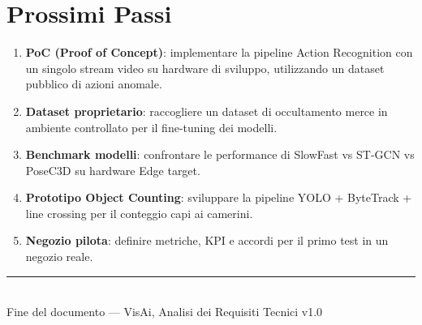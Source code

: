 \documentclass[a4paper, 12pt]{article}
\begin{document}
\section{Prossimi Passi}

\begin{enumerate}
    \item \textbf{PoC (Proof of Concept)}: implementare la pipeline Action Recognition con un singolo stream video su hardware di sviluppo, utilizzando un dataset pubblico di azioni anomale.
    \item \textbf{Dataset proprietario}: raccogliere un dataset di occultamento merce in ambiente controllato per il fine-tuning dei modelli.
    \item \textbf{Benchmark modelli}: confrontare le performance di SlowFast vs ST-GCN vs PoseC3D su hardware Edge target.
    \item \textbf{Prototipo Object Counting}: sviluppare la pipeline YOLO + ByteTrack + line crossing per il conteggio capi ai camerini.
    \item \textbf{Negozio pilota}: definire metriche, KPI e accordi per il primo test in un negozio reale.
\end{enumerate}

\vfill
\begin{center}
    \textcolor{visaigray}{\rule{0.5\textwidth}{0.4pt}}\\
    \vspace{0.5cm}
    \textcolor{visaigray}{\footnotesize Fine del documento — VisAi, Analisi dei Requisiti Tecnici v1.0}
\end{center}
\end{document}
